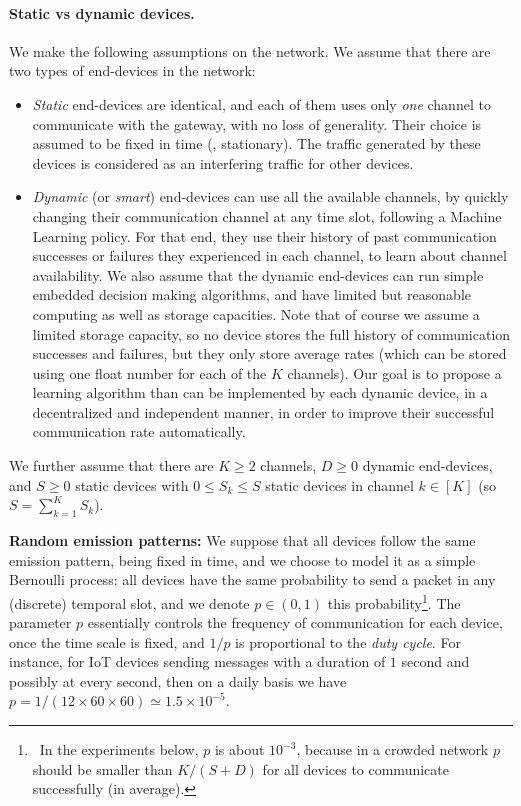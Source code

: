 \paragraph{Static vs dynamic devices.}
%
We make the following assumptions on the network.
We assume that there are two types of end-devices in the network:
\begin{itemize}
    \item
    \emph{Static} end-devices are identical, and each of them uses only \emph{one} channel to communicate with the gateway, with no loss of generality.
    Their choice is assumed to be fixed in time (\ie, stationary). The traffic generated by these devices is considered as an interfering traffic for other devices.
    \item
    \emph{Dynamic} (or \emph{smart}) end-devices can use all the available channels, by quickly changing their communication channel at any time slot, following a Machine Learning policy.
    For that end, they use their history of past communication successes or failures they experienced in each channel, to learn about channel availability.
    We also assume that the dynamic end-devices can run simple embedded decision making algorithms, and have limited but reasonable computing as well as storage capacities.
    Note that of course we assume a limited storage capacity, so no device stores the full history of communication successes and failures, but they only store average rates (which can be stored using one float number for each of the $K$ channels).
    Our goal is to propose a learning algorithm than can be implemented by each dynamic device, in a decentralized and independent manner, in order to improve their successful communication rate automatically.
\end{itemize}

We further assume that there are $K \geq 2$ channels, $D \geq 0$ dynamic end-devices, and $S \geq 0$ static devices
with $0 \leq S_k \leq S$ static devices in channel $k \in [K]$ (so $S = \sum_{k=1}^{K} S_k$).


\textbf{Random emission patterns:}
%
We suppose that all devices follow the same emission pattern, being fixed in time, and we choose to model it as a simple Bernoulli process:
all devices have the same probability to send a packet in any (discrete) temporal slot, and we denote $p \in (0, 1)$ this probability\footnote{~In the experiments below, $p$ is about $10^{-3}$, because in a crowded network $p$ should be smaller than $K / (S + D)$ for all devices to communicate successfully (in average).}.
The parameter $p$ essentially controls the frequency of communication for each device, once the time scale is fixed, and $1/p$ is proportional to the \emph{duty cycle}.
For instance, for IoT devices sending messages with a duration of $1$ second and possibly at every second, then on a daily basis we have $p = 1 / (12 \times 60 \times 60) \simeq 1.5 \times 10^{-5}$.


